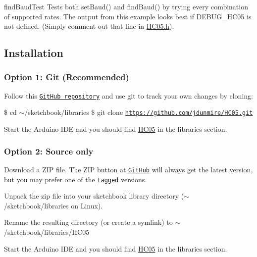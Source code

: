 {\ttfamily find\+Baud\+Test} Tests both set\+Baud() and find\+Baud() by trying every combination of supported rates. The output from this example looks best if D\+E\+B\+U\+G\+\_\+\+H\+C05 is not defined. (Simply comment out that line in \hyperlink{_h_c05_8h}{H\+C05.\+h}).

\subsection*{Installation }

\subsubsection*{Option 1\+: Git (Recommended)}


\begin{DoxyItemize}
\item Follow this \href{https://github.com/jdunmire/HC05}{\tt Git\+Hub repository} and use {\ttfamily git} to track your own changes by cloning\+:

\$ cd $\sim$/sketchbook/libraries \$ git clone \href{https://github.com/jdunmire/HC05.git}{\tt https\+://github.\+com/jdunmire/\+H\+C05.\+git}
\item Start the Arduino I\+DE and you should find {\ttfamily \hyperlink{class_h_c05}{H\+C05}} in the libraries section.
\end{DoxyItemize}

\subsubsection*{Option 2\+: Source only}


\begin{DoxyItemize}
\item Download a Z\+IP file. The Z\+IP button at \href{https://github.com/jdunmire/HC05}{\tt Git\+Hub} will always get the latest version, but you may prefer one of the \href{https://github.com/jdunmire/HC05/tags}{\tt tagged} versions.
\item Unpack the zip file into your sketchbook library directory ({\ttfamily $\sim$/sketchbook/libraries} on Linux).
\item Rename the resulting directory (or create a symlink) to $\sim$/sketchbook/libraries/\+H\+C05
\item Start the Arduino I\+DE and you should find {\ttfamily \hyperlink{class_h_c05}{H\+C05}} in the libraries section.
\end{DoxyItemize}


